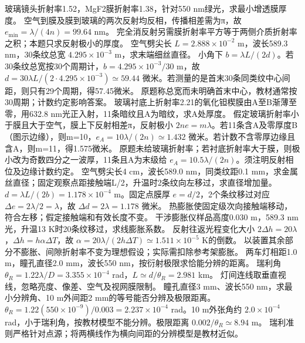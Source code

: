 \problemtext 玻璃镜头折射率1.52，MgF2膜折射率1.38，针对550 nm绿光，求最小增透膜厚度。
\workings 空气到膜及膜到玻璃的两次反射均反相，传播相差需为π，故 $e_{\min}=\lambda/(4n)=99.64$ nm。
\crosscheck 完全消反射另需膜折射率平方等于两侧介质折射率之积；本题只求反射极小的厚度。
\problemtext 空气劈尖长 $L=2.888\times10^{-2}$ m，波长589.3 nm，30条纹总宽 $4.295\times10^{-3}$ m，求末端细丝直径。
\workings 小角下 $b=\lambda L/(2d)$。若30条纹总宽按30个周期计，$b=4.295\times10^{-3}/30$ m，故 $d=30\lambda L/(2\cdot4.295\times10^{-3})\simeq59.44$ 微米。若测量的是首末30条同类纹中心间距，则只有29个周期，得57.45微米。
\crosscheck 原题称总宽而未明确首末中心，教材通常按30周期；计数约定影响答案。
\problemtext 玻璃衬底上折射率2.21的氧化钽楔膜由A至B渐薄至零，用632.8 nm光正入射，11条暗纹且A为暗纹，求A处厚度。
\workings 假定玻璃折射率小于膜且大于空气，膜上下反射相差π，反射极小 $2ne=m\lambda$。若11条含A及零厚度B（图示边缘），则m=10，$e_A=10\lambda/(2n)\simeq1.432$ 微米。若计数不含零厚边缘且含A，则m=11，得1.575微米。
\crosscheck 原题未给玻璃折射率；若衬底折射率大于膜，则极小改为奇数四分之一波厚，11条且A为末级给 $e_A=10.5\lambda/(2n)$。须注明反射相位及边缘计数约定。
\problemtext 空气劈尖长4 cm，波长589.0 nm，同类纹距0.1 mm，求金属丝直径；固定观察点距接触端L/2，升温时2条纹向左移过，求直径增加量。
\workings $d=\lambda L/(2b)=1.178\times10^{-4}$ m。固定点膜厚 $e=d/2$，2个条纹移过对应 $\Delta e=2\lambda/2=\lambda$，故 $\Delta d=2\lambda=1.178$ 微米。
\crosscheck 热膨胀使固定级次向接触端移动，符合左移；假定接触端和有效长度不变。
\problemtext 干涉膨胀仪样品高度0.030 m，589.3 nm光，升温13 K时20条纹移过，求线膨胀系数。
\workings 反射往返光程变化大小 $2\Delta h=20\lambda$，$\Delta h=h\alpha\Delta T$，故 $\alpha=20\lambda/(2h\Delta T)\simeq1.511\times10^{-5}$ K的倒数。
\crosscheck 以装置其余部分不膨胀、间隙折射率不变为理想假设；实际需扣除参考架膨胀。
\problemtext 两车灯相距1.0 m，瞳孔直径2.0 mm，波长550 nm，按衍射极限求恰能分辨的距离。
\workings 瑞利角 $\theta_R=1.22\lambda/D=3.355\times10^{-4}$ rad，$L\simeq d/\theta_R=2.981$ km。
\crosscheck 灯间连线取垂直视线，忽略亮度、像差、空气及视网膜限制。
\problemtext 瞳孔直径3 mm、波长550 nm，求最小分辨角、10 m外间距2 mm的等号能否分辨及极限距离。
\workings $\theta_R=1.22(550\times10^{-9})/0.003=2.237\times10^{-4}$ rad。10 m外张角约 $2.0\times10^{-4}$ rad，小于瑞利角，按教材模型不能分辨。极限距离 $0.002/\theta_R\simeq8.94$ m。
\crosscheck 瑞利准则严格针对点源；将两横线作为横向间距的分辨模型是教材近似。
